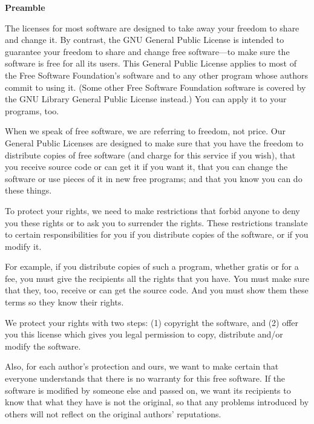 \documentclass{article}
\begin{document}
      \begin{center}
      {\bf\large Preamble}
      \end{center}
      
      
      The licenses for most software are designed to take away your freedom to
      share and change it.  By contrast, the GNU General Public License is
      intended to guarantee your freedom to share and change free software---to
      make sure the software is free for all its users.  This General Public
      License applies to most of the Free Software Foundation's software and to
      any other program whose authors commit to using it.  (Some other Free
      Software Foundation software is covered by the GNU Library General Public
      License instead.)  You can apply it to your programs, too.
      
      When we speak of free software, we are referring to freedom, not price.
      Our General Public Licenses are designed to make sure that you have the
      freedom to distribute copies of free software (and charge for this service
      if you wish), that you receive source code or can get it if you want it,
      that you can change the software or use pieces of it in new free programs;
      and that you know you can do these things.
      
      To protect your rights, we need to make restrictions that forbid anyone to
      deny you these rights or to ask you to surrender the rights.  These
      restrictions translate to certain responsibilities for you if you
      distribute copies of the software, or if you modify it.
      
      For example, if you distribute copies of such a program, whether gratis or
      for a fee, you must give the recipients all the rights that you have.  You
      must make sure that they, too, receive or can get the source code.  And
      you must show them these terms so they know their rights.
      
      We protect your rights with two steps: (1) copyright the software, and (2)
      offer you this license which gives you legal permission to copy,
      distribute and/or modify the software.
      
      Also, for each author's protection and ours, we want to make certain that
      everyone understands that there is no warranty for this free software.  If
      the software is modified by someone else and passed on, we want its
      recipients to know that what they have is not the original, so that any
      problems introduced by others will not reflect on the original authors'
      reputations.
      
\end{document}
